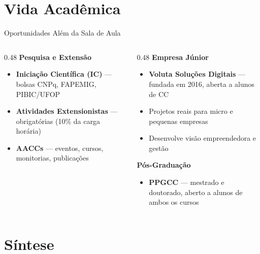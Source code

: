 \documentclass[aspectratio=169]{beamer}
\begin{document}
\section{Vida Acadêmica}

\begin{frame}{Oportunidades Além da Sala de Aula}
  \begin{columns}[T]
    \begin{column}{0.48\textwidth}
      \textbf{Pesquisa e Extensão}
      \begin{itemize}\setlength\itemsep{3pt}
        \item \textbf{Iniciação Científica (IC)} --- bolsas CNPq, FAPEMIG, PIBIC/UFOP
        \item \textbf{Atividades Extensionistas} --- obrigatórias (10\% da carga horária)
        \item \textbf{AACCs} --- eventos, cursos, monitorias, publicações
      \end{itemize}
    \end{column}
    \begin{column}{0.48\textwidth}
      \textbf{Empresa Júnior}
      \begin{itemize}\setlength\itemsep{3pt}
        \item \textbf{Voluta Soluções Digitais} --- fundada em 2016, aberta a alunos de CC
        \item Projetos reais para micro e pequenas empresas
        \item Desenvolve visão empreendedora e gestão
      \end{itemize}
      \vspace{0.2cm}
      \textbf{Pós-Graduação}
      \begin{itemize}
        \item \textbf{PPGCC} --- mestrado e doutorado, aberto a alunos de ambos os cursos
      \end{itemize}
    \end{column}
  \end{columns}
\end{frame}

\section{Síntese}
\end{document}
